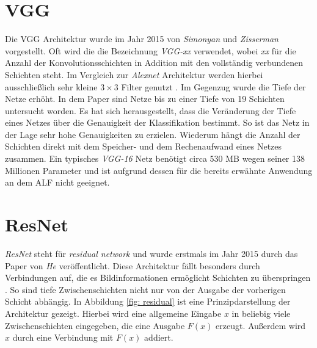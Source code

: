 		\section*{VGG}
		\label{subsec: vgg}
		Die VGG Architektur wurde im Jahr 2015 von \textit{Simonyan} und \textit{Zisserman} \cite{vgg} vorgestellt. Oft wird die die Bezeichnung \textit{VGG-xx} verwendet, wobei \textit{xx} für die Anzahl der Konvolutionsschichten in Addition mit den vollständig verbundenen Schichten steht. Im Vergleich zur \textit{Alexnet} Architektur werden hierbei ausschließlich sehr kleine $3 \times 3$ Filter genutzt \cite{alexnet} \cite{vgg}. Im Gegenzug wurde die Tiefe der Netze erhöht. In dem Paper sind Netze bis zu einer Tiefe von 19 Schichten untersucht worden\cite{vgg}. Es hat sich herausgestellt, dass die Veränderung der Tiefe eines Netzes über die Genauigkeit der Klassifikation bestimmt. So ist das Netz in der Lage sehr hohe Genauigkeiten zu erzielen. Wiederum hängt die Anzahl der Schichten direkt mit dem Speicher- und dem Rechenaufwand eines Netzes zusammen. Ein typisches \textit{VGG-16} Netz benötigt circa 530 MB wegen seiner 138 Millionen Parameter und ist aufgrund dessen für die bereits erwähnte Anwendung an dem ALF nicht geeignet.\\
		
		\section*{ResNet}
		\label{subsec: resnet}
		\textit{ResNet} steht für \textit{residual network} und wurde erstmals im Jahr 2015 durch das Paper von \textit{He} veröffentlicht. Diese Architektur fällt besonders durch Verbindungen auf, die es Bildinformationen ermöglicht Schichten zu überspringen \cite{resnet}. So sind tiefe Zwischenschichten nicht nur von der Ausgabe der vorherigen Schicht abhängig. In Abbildung \ref{fig: residual} ist eine Prinzipdarstellung der Architektur gezeigt. Hierbei wird eine allgemeine Eingabe $x$ in beliebig viele Zwischenschichten eingegeben, die eine Ausgabe $F(x)$ erzeugt. Außerdem wird $x$ durch eine Verbindung mit $F(x)$ addiert.
		
